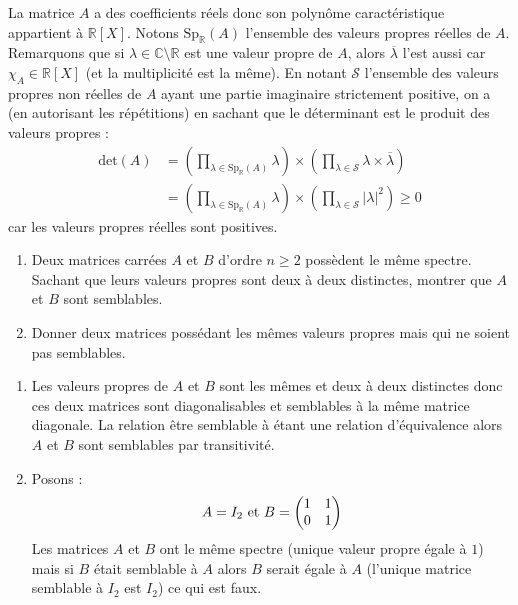 \documentclass[a4paper,10pt]{report}
\begin{document}
\corr La matrice $A$ a des coefficients réels donc son polynôme caractéristique appartient à $\mathbb{R}[X]$. Notons $\textrm{Sp}_{\mathbb{R}}(A)$ l'ensemble des valeurs propres réelles de $A$. Remarquons que si $\lambda \in \mathbb{C} \setminus \mathbb{R}$ est une valeur propre de $A$, alors $\overline{\lambda}$ l'est aussi car $\chi_A \in \mathbb{R}[X]$ (et la multiplicité est la même). En notant $\mathcal{S}$ l'ensemble des valeurs propres non réelles de $A$ ayant une partie imaginaire strictement positive, on a (en autorisant les répétitions) en sachant que le déterminant est le produit des valeurs propres :
\begin{align*}
 \textrm{det}(A) & = \left(\prod_{ \lambda \in \textrm{Sp}_{\mathbb{R}}(A)} \lambda \right) \times \left(\prod_{ \lambda \in \mathcal{S}} \lambda  \times \overline{\lambda }\right)  \\
&  = \left(\prod_{ \lambda \in \textrm{Sp}_{\mathbb{R}}(A)} \lambda \right) \times \left(\prod_{ \lambda \in \mathcal{S}} \vert \lambda \vert ^2\right) \geq 0 
 \end{align*}
  car les valeurs propres réelles sont positives.


\begin{Exa}
\begin{enumerate}
\item Deux matrices carrées $A$ et $B$ d'ordre $n \geq 2$ possèdent le même spectre. Sachant que leurs valeurs propres sont deux à deux distinctes, montrer que $A$ et $B$ sont semblables.
\item Donner deux matrices possédant les mêmes valeurs propres mais qui ne soient pas semblables.
\end{enumerate}
\end{Exa} 

\corr \begin{enumerate}
\item Les valeurs propres de $A$ et $B$ sont les mêmes et deux à deux distinctes donc ces deux matrices sont diagonalisables et semblables à la même matrice diagonale. La relation \og être semblable à \fg étant une relation d'équivalence alors $A$ et $B$ sont semblables par transitivité.
\item Posons :
$$ A = I_2 \hbox{ et } B = \begin{pmatrix}
1 & 1 \\
0 & 1 
\end{pmatrix}$$
Les matrices $A$ et $B$ ont le même spectre (unique valeur propre égale à $1$) mais si $B$ était semblable à $A$ alors $B$ serait égale à $A$ (l'unique matrice semblable à $I_2$ est $I_2$) ce qui est faux.
\end{enumerate}
\end{document}
